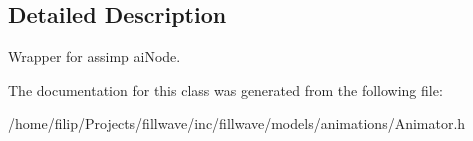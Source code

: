 \subsection{Detailed Description}
Wrapper for assimp ai\+Node. 

The documentation for this class was generated from the following file\+:\begin{DoxyCompactItemize}
\item 
/home/filip/\+Projects/fillwave/inc/fillwave/models/animations/Animator.\+h\end{DoxyCompactItemize}
